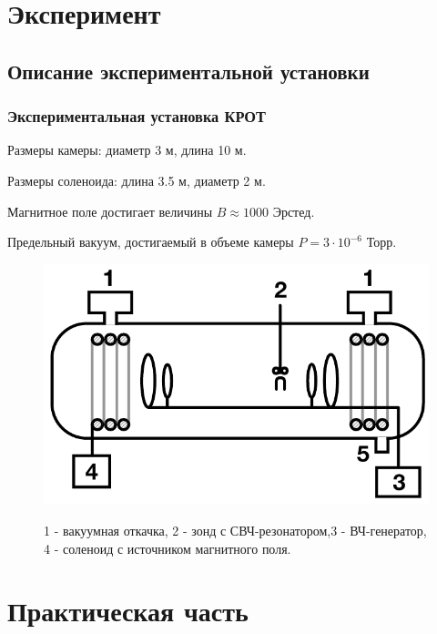 \documentclass[10pt,pdf,hyperref={unicode}, dvipsnames]{beamer}
\begin{document}
\section{Эксперимент}
\subsection{Описание экспериментальной установки}
\begin{frame}
	\frametitle{Экспериментальная установка КРОТ}
	Размеры камеры: диаметр 3 м, длина 10 м.

	Размеры соленоида: длина 3.5 м, диаметр 2 м. 
	
	Магнитное поле достигает величины $B\approx 1000$ Эрстед. 
	
	Предельный вакуум, достигаемый в объеме камеры $P =3\cdot10^{-6}$ Торр. 
	\begin{figure}[tb]
		\vspace{0pt}
		\centering
		\includegraphics[width=0.6\linewidth]{fig/krot}
		\label{fig:krot}
		\caption{1 - вакуумная откачка, 2 - зонд с СВЧ-резонатором,3 - ВЧ-генератор, 4 - соленоид с источником магнитного поля.}
	\end{figure}
\end{frame}
\section{Практическая часть} %
\end{document}
